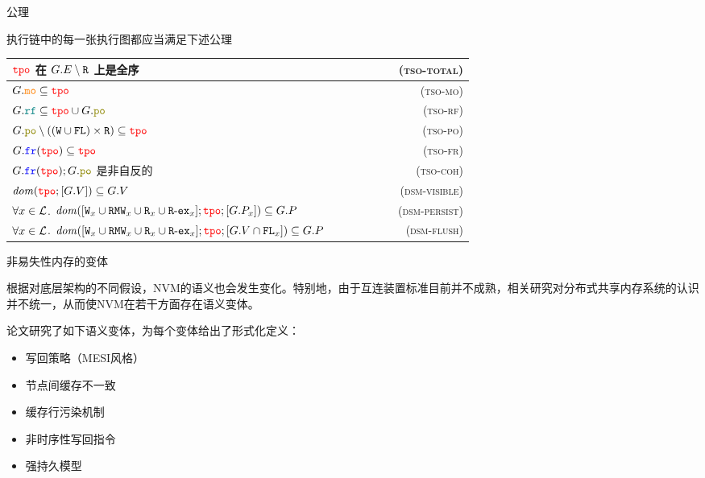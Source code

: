 \documentclass{beamer}
\begin{document}
\begin{frame}{公理}
    
    执行链中的每一张执行图都应当满足下述公理

    \vfill
    \centering
    \begin{tabular}{>{\raggedright\arraybackslash}p{0.7\linewidth}r}
      \hline
      $\color{red}\mathtt{tpo}\color{black}$ 在 $G.E \setminus \mathtt{R}$ 上是全序 & {\textsc{(tso-total)}} \\
      \hline
      $G.\color{orange}\mathtt{mo}\color{black} \subseteq \color{red}\mathtt{tpo}\color{black}$ & {\textsc{(tso-mo)}} \\
      \hline
      $G.\rf \subseteq \tpo \cup G.\po$ & {\textsc{(tso-rf)}} \\
      \hline
      $G.\po \setminus ((\writeE \cup \flushE) \times \readE) \subseteq \tpo$ & {\textsc{(tso-po)}} \\
      \hline
      $G.\color{blue}\mathtt{fr}\color{black}(\color{red}\mathtt{tpo}\color{black}) \subseteq \color{red}\mathtt{tpo}\color{black}$ & {\textsc{(tso-fr)}} \\
      \hline
      $G.\fr(\tpo) ; G.\po$ 是非自反的 & {\textsc{(tso-coh)}} \\
      \hline
      $\mathit{dom}(\color{red}\mathtt{tpo}\color{black} ; [G.V]) \subseteq G.V$ & {\textsc{(dsm-visible)}} \\
      \hline
      $\forall x \in \mathcal{L}$. $\mathit{dom}([\mathtt{W}_x \cup \mathtt{RMW}_x \cup \mathtt{R}_x \cup \mathtt{R\text{-}ex}_x]; \color{red}\mathtt{tpo}\color{black}; [G.P_x]) \subseteq G.P$ & {\textsc{(dsm-persist)}} \\
      \hline
      $\forall x \in \mathcal{L}$. $\mathit{dom}([\mathtt{W}_x \cup \mathtt{RMW}_x \cup \mathtt{R}_x \cup \mathtt{R\text{-}ex}_x]; \color{red}\mathtt{tpo}\color{black} ; [G.V \cap \mathtt{FL}_x]) \subseteq G.P$ & {\textsc{(dsm-flush)}} \\
      \hline
    \end{tabular}
\end{frame}

\begin{frame}{非易失性内存的变体}
    
    根据对底层架构的不同假设，NVM的语义也会发生变化。特别地，由于互连装置标准目前并不成熟，相关研究对分布式共享内存系统的认识并不统一，从而使NVM在若干方面存在语义变体。

    \vfill
    论文研究了如下语义变体，为每个变体给出了形式化定义：

    \begin{itemize}
        \item 写回策略（MESI风格）
        \item 节点间缓存不一致
        \item 缓存行污染机制
        \item 非时序性写回指令
        \item 强持久模型
    \end{itemize}
    
\end{frame}
\end{document}
